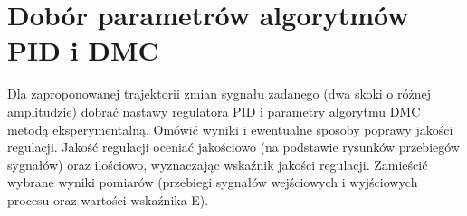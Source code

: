 \section{Dobór parametrów algorytmów PID i DMC}
Dla zaproponowanej trajektorii zmian sygnału zadanego (dwa skoki o różnej amplitudzie) dobrać nastawy regulatora PID i parametry algorytmu DMC metodą eksperymentalną. Omówić wyniki i ewentualne sposoby poprawy jakości regulacji. Jakość
regulacji oceniać jakościowo (na podstawie rysunków przebiegów sygnałów) oraz ilościowo, wyznaczając wskaźnik jakości regulacji. Zamieścić wybrane wyniki pomiarów
(przebiegi sygnałów wejściowych i wyjściowych procesu oraz wartości wskaźnika E).